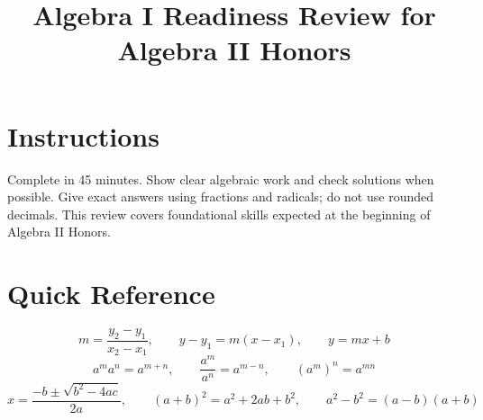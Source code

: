 \documentclass[12pt]{article}
\title{Algebra I Readiness Review for Algebra II Honors}
\author{}
\date{}
\begin{document}
\maketitle

\section*{Instructions}
Complete in 45 minutes. Show clear algebraic work and check solutions when possible. Give exact answers using fractions and radicals; do not use rounded decimals. This review covers foundational skills expected at the beginning of Algebra II Honors.

\section*{Quick Reference}
\[
  m=\frac{y_2-y_1}{x_2-x_1},
  \qquad y-y_1=m(x-x_1),
  \qquad y=mx+b
\]
\[
  a^ma^n=a^{m+n},
  \qquad \frac{a^m}{a^n}=a^{m-n},
  \qquad (a^m)^n=a^{mn}
\]
\[
  x=\frac{-b\pm\sqrt{b^2-4ac}}{2a},
  \qquad
  (a+b)^2=a^2+2ab+b^2,
  \qquad
  a^2-b^2=(a-b)(a+b)
\]
\end{document}
